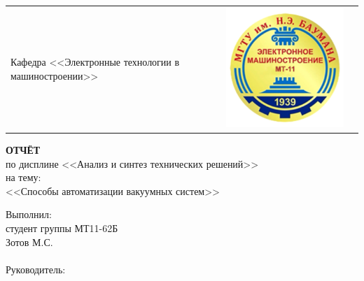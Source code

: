 \documentclass[AISTR.tex]{subfiles}
\begin{document}
\begin{titlepage}
\begin{center}
\begin{tabular}{C{3cm}C{10cm}C{3cm}}
{		Кафедра <<Электронные технологии в машиностроении>>}&\includegraphics[width=\linewidth]{images/titul/mt11.png}
	\end{tabular}
\end{center}
		\vspace{2em}
		\begin{center}
			{\Large \bfseries ОТЧЁТ}\\
			по дисплине
			<<Анализ и синтез технических решений>>\\
			на тему:\\
			<<Способы автоматизации вакуумных систем>>
		\end{center}
		\vspace{1em}
		\newbox{\lbox}
		\newlength{\maxl}
		\setlength{\maxl}{\wd\lbox}
		\hfill\parbox{11cm}
		{
			\hspace*{5cm}Выполнил:\hfill\\
			\hspace*{5cm}студент группы МТ11-62Б \hfill\\
			\hspace*{5cm}Зотов М.С.\hfill\\\\
			\hspace*{5cm}Руководитель:\hfill\\
}
\end{titlepage}
\end{document}
